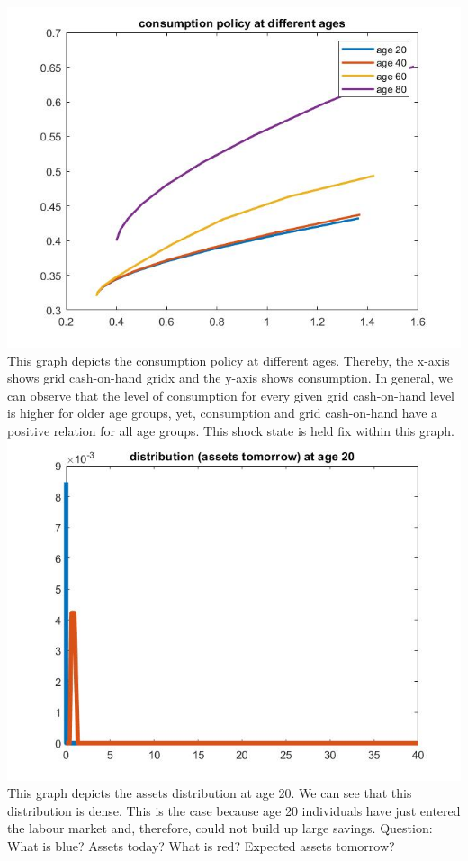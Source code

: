 \documentclass[12pt,a4paper]{article}
\begin{document}
\includegraphics[width=14cm]{Graphs/Figure1} \\
This graph depicts the consumption policy at different ages. Thereby, the x-axis shows grid cash-on-hand gridx and the y-axis shows consumption. In general, we can observe that the level of consumption for every given grid cash-on-hand level is higher for older age groups, yet, consumption and grid cash-on-hand have a positive relation for all age groups. This shock state is held fix within this graph. \\
\includegraphics[width=14cm]{Graphs/Figure2} \\
This graph depicts the assets distribution at age 20. We can see that this distribution is dense. This is the case because age 20 individuals have just entered the labour market and, therefore, could not build up large savings. Question: What is blue? Assets today? What is red? Expected assets tomorrow? \\
\end{document}
